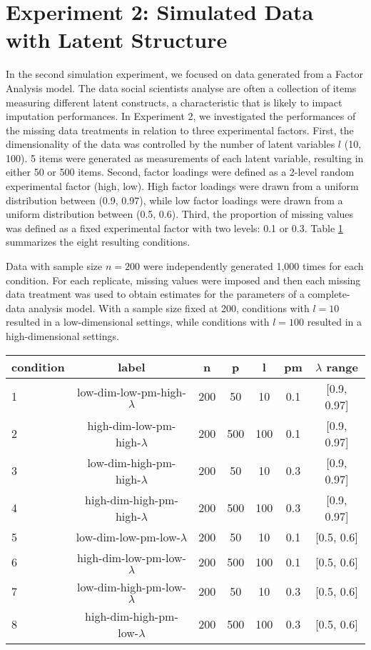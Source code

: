 \section{Experiment 2: Simulated Data with Latent Structure}

In the second simulation experiment, we focused on data generated from a Factor Analysis model.
The data social scientists analyse are often a collection of items measuring different latent constructs, 
a characteristic that is likely to impact imputation performances.
In Experiment 2, we investigated the performances of the missing data treatments in relation to three experimental factors.
First, the dimensionality of the data was controlled by the number of latent variables $l$ (10, 100).
5 items were generated as measurements of each latent variable, resulting in either 50 or 500 items.
Second, factor loadings were defined as a 2-level random experimental factor (high, low).
High factor loadings were drawn from a uniform distribution between (0.9, 0.97), while low factor loadings
were drawn from a uniform distribution between (0.5, 0.6).
Third, the proportion of missing values was defined as a fixed experimental factor with two levels: 0.1 or 0.3.
Table \ref{tab:condExp2} summarizes the eight resulting conditions.

Data with sample size $n=200$ were independently generated 1,000 times for each condition.
For each replicate, missing values were imposed and then each missing data treatment was used to obtain estimates 
for the parameters of a complete-data analysis model.
With a sample size fixed at 200, conditions with $l = 10$ resulted in a low-dimensional settings, while conditions 
with $l = 100$ resulted in a high-dimensional settings.

\begin{table}
	{
	\begin{tabular}{l c c c c c c } 
		\toprule
		condition & label & n & p & l & pm & $\lambda$ range \\
		\midrule
		1 & low-dim-low-pm-high-$\lambda$ & 200 & 50 &  10 &  0.1 & [0.9, 0.97] \\
		2 & high-dim-low-pm-high-$\lambda$ & 200 & 500 & 100 & 0.1 & [0.9, 0.97] \\
		3 & low-dim-high-pm-high-$\lambda$ & 200 & 50 &  10 &  0.3 & [0.9, 0.97] \\
		4 & high-dim-high-pm-high-$\lambda$ & 200 & 500 & 100 & 0.3 & [0.9, 0.97] \\
		5 & low-dim-low-pm-low-$\lambda$ & 200 & 50 &  10 &  0.1 & [0.5, 0.6]  \\
		6 & high-dim-low-pm-low-$\lambda$ & 200 & 500 & 100 & 0.1 & [0.5, 0.6]  \\
		7 & low-dim-high-pm-low-$\lambda$ & 200 & 50 &  10 &  0.3 & [0.5, 0.6]  \\
		8 & high-dim-high-pm-low-$\lambda$ & 200 & 500 & 100 & 0.3 & [0.5, 0.6]  \\
		\bottomrule
	\end{tabular}
	}
\label{tab:condExp2}
\end{table}

